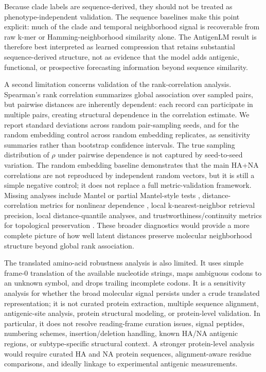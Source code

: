\documentclass[11pt]{article}
\begin{document}
Because clade labels are sequence-derived, they should not be treated as phenotype-independent validation. The sequence baselines make this point explicit: much of the clade and temporal neighborhood signal is recoverable from raw k-mer or Hamming-neighborhood similarity alone. The AntigenLM result is therefore best interpreted as learned compression that retains substantial sequence-derived structure, not as evidence that the model adds antigenic, functional, or prospective forecasting information beyond sequence similarity.

A second limitation concerns validation of the rank-correlation analysis. Spearman's rank correlation summarizes global association over sampled pairs, but pairwise distances are inherently dependent: each record can participate in multiple pairs, creating structural dependence in the correlation estimate. We report standard deviations across random pair-sampling seeds, and for the random embedding control across random embedding replicates, as sensitivity summaries rather than bootstrap confidence intervals. The true sampling distribution of $\rho$ under pairwise dependence is not captured by seed-to-seed variation. The random embedding baseline demonstrates that the main HA+NA correlations are not reproduced by independent random vectors, but it is still a simple negative control; it does not replace a full metric-validation framework. Missing analyses include Mantel or partial Mantel-style tests \cite{mantel1967detection}, distance-correlation metrics for nonlinear dependence \cite{szekely2007distance}, local k-nearest-neighbor retrieval precision, local distance-quantile analyses, and trustworthiness/continuity metrics for topological preservation \cite{lee2009quality}. These broader diagnostics would provide a more complete picture of how well latent distances preserve molecular neighborhood structure beyond global rank association.

The translated amino-acid robustness analysis is also limited. It uses simple frame-0 translation of the available nucleotide strings, maps ambiguous codons to an unknown symbol, and drops trailing incomplete codons. It is a sensitivity analysis for whether the broad molecular signal persists under a crude translated representation; it is not curated protein extraction, multiple sequence alignment, antigenic-site analysis, protein structural modeling, or protein-level validation. In particular, it does not resolve reading-frame curation issues, signal peptides, numbering schemes, insertion/deletion handling, known HA/NA antigenic regions, or subtype-specific structural context. A stronger protein-level analysis would require curated HA and NA protein sequences, alignment-aware residue comparisons, and ideally linkage to experimental antigenic measurements.
\end{document}
